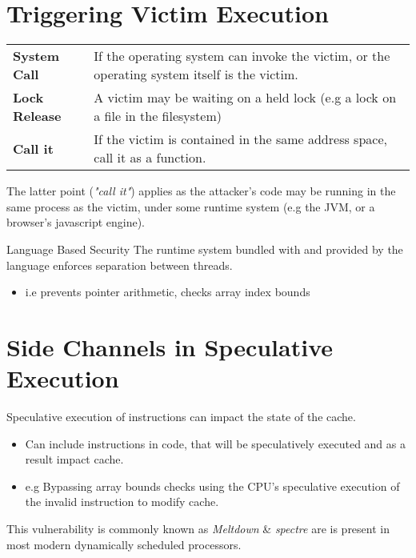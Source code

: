\section{Triggering Victim Execution}
\begin{center}
	\begin{tabular}{p{} p{}}
		\textbf{System Call}  & If the operating system can invoke the victim, or the operating system itself is the victim. \\
		\textbf{Lock Release} & A victim may be waiting on a held lock (e.g a lock on a file in the filesystem)              \\
		\textbf{Call it}      & If the victim is contained in the same address space, call it as a function.                 \\
	\end{tabular}
\end{center}
The latter point (\textit{"call it"}) applies as the attacker's code may be running in the same process as the victim, under some runtime system (e.g the JVM, or a browser's javascript engine).
\begin{definitionbox}{Language Based Security}
	The runtime system bundled with and provided by the language enforces separation between threads.
	\begin{itemize}
		\item i.e prevents pointer arithmetic, checks array index bounds
	\end{itemize}
\end{definitionbox}

\section{Side Channels in Speculative Execution}
Speculative execution of instructions can impact the state of the cache.
\begin{itemize}
	\item Can include instructions in code, that will be speculatively executed and as a result impact cache.
	\item e.g Bypassing array bounds checks using the CPU's speculative execution of the invalid instruction to modify cache.
\end{itemize}
This vulnerability is commonly known as \textit{Meltdown} \& \textit{spectre} are is present in most modern dynamically scheduled processors.


